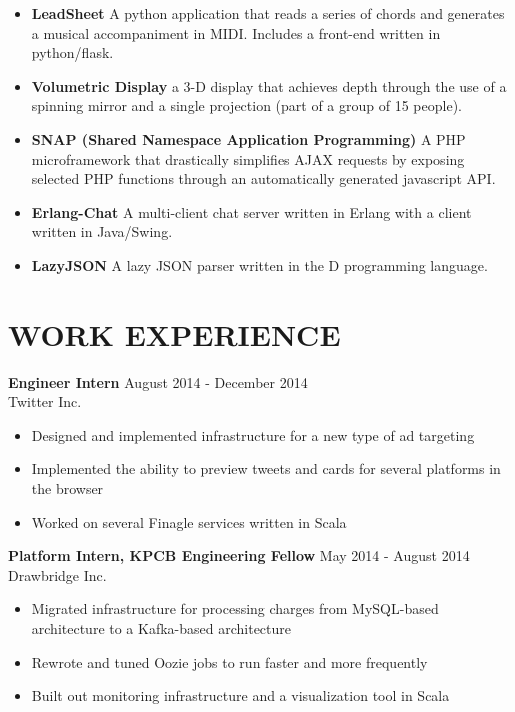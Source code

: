 \documentclass[line,margin]{res}
\begin{document}
\begin{resume}
\begin{itemize}
\item {\bf LeadSheet} A python application that reads a series of chords and
   generates a musical accompaniment in MIDI. Includes a front-end written in
   python/flask.

\item {\bf Volumetric Display} a 3-D display that achieves depth through the
   use of a spinning mirror and a single projection
   (part of a group of 15 people).

\item {\bf SNAP (Shared Namespace Application Programming)}
   A PHP microframework that drastically simplifies AJAX requests by
   exposing selected PHP functions through an automatically generated
   javascript API.


\item {\bf Erlang-Chat}   A multi-client chat server written in Erlang with a
   client written in Java/Swing.



\item {\bf LazyJSON}  A lazy JSON parser written in the D programming language.


\end{itemize}

\section{WORK EXPERIENCE}

{\bf Engineer Intern} \hfill August 2014 - December 2014 \\
  Twitter Inc.
  \begin{itemize}
  \item Designed and implemented infrastructure for a new type of ad targeting
  \item Implemented the ability to preview tweets and cards for several platforms in the browser
  \item Worked on several Finagle services written in Scala
  \end{itemize}

{\bf Platform Intern, KPCB Engineering Fellow} \hfill May 2014 - August 2014 \\
    Drawbridge Inc.

    \begin{itemize}
    \item Migrated infrastructure for processing charges from MySQL-based architecture
    to a Kafka-based architecture
    \item Rewrote and tuned Oozie jobs to run faster and more frequently
    \item Built out monitoring infrastructure and a visualization tool in Scala
    \end{itemize}


\end{resume}
\end{document}
